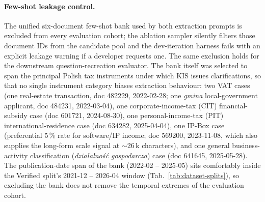 \paragraph{Few-shot leakage control.}
The unified six-document few-shot bank used by both extraction
prompts is excluded from every evaluation cohort; the ablation
sampler silently filters those document IDs from the candidate pool
and the dev-iteration harness fails with an explicit leakage warning
if a developer requests one. The same exclusion holds for the
downstream question-recreation evaluator. The bank itself was
selected to span the principal Polish tax instruments under which
KIS issues clarifications, so that no single instrument category
biases extraction behaviour: two VAT cases (one real-estate
transaction, doc 482229, 2022-02-28; one \textit{gmina}
local-government applicant, doc 484231, 2022-03-04), one
corporate-income-tax (CIT) financial-subsidy case (doc 601721,
2024-08-30), one personal-income-tax (PIT) international-residence
case (doc 634282, 2025-04-04), one IP-Box case (preferential 5\,\%
rate for software/IP income; doc 569200, 2023-11-08, which also
supplies the long-form scale signal at $\sim$26\,k characters), and
one general business-activity classification (\textit{działalność
gospodarcza}) case (doc 641645, 2025-05-28). The publication-date
span of the bank (2022-02 -- 2025-05) sits comfortably inside the
Verified split's 2021-12 -- 2026-04 window
(Tab.~\ref{tab:dataset-splits}), so excluding the bank does not
remove the temporal extremes of the evaluation cohort.

